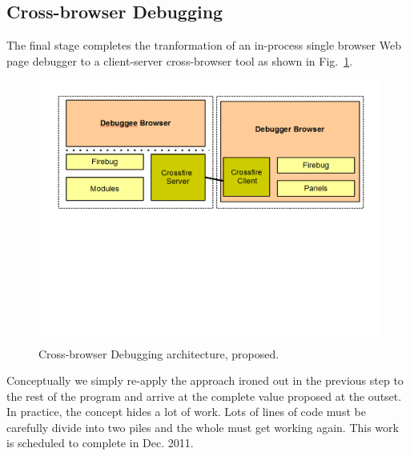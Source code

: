 \subsection{Cross-browser Debugging}
The final stage completes the tranformation of an in-process single browser Web page debugger to a client-server 
cross-browser tool as shown in Fig.~\ref{fig:crossbrowser}.  
\begin{figure}
  \includegraphics  [width = 86 mm] {figures/crossbrowser.png}
  \caption{Cross-browser Debugging architecture, proposed.}
 \label{fig:crossbrowser}
\end{figure}
Conceptually we simply re-apply the approach ironed out in the previous step to the rest of the 
program and arrive at the complete value proposed at the outset. In practice, the concept hides a lot of work. Lots of lines of code 
must be carefully divide into two piles and the whole must get working again. This work is scheduled to complete in Dec. 2011.





















